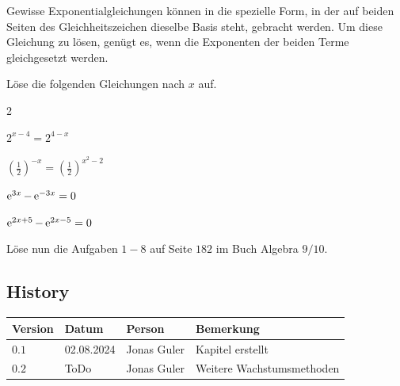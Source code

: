 \documentclass[11pt,oneside]{article}
\begin{document}
	\begin{satz}[Exponentenvergleich]
		Gewisse Exponentialgleichungen können in die spezielle Form, in der auf beiden Seiten des Gleichheitszeichen dieselbe Basis steht, gebracht werden. Um diese Gleichung zu lösen, genügt es, wenn die Exponenten der beiden Terme gleichgesetzt werden.
	\end{satz}
	\begin{aufgabe}
		Löse die folgenden Gleichungen nach $x$ auf.
		\begin{enumerate}[label=\alph*)]\end{enumerate}
		Löse nun die Aufgaben $1-8$ auf Seite $182$ im Buch Algebra $9/10$.
	\end{aufgabe}

\newpage
\subsection*{History}
\begin{table}[H]
	\centering
	\begin{tabular}{|p{13mm}|p{20mm}|p{30mm}|p{70mm}|}\hline
		Version & Datum & Person & Bemerkung \\\hline
		$0.1$ & 02.08.2024 & Jonas Guler & Kapitel erstellt \\\hline
		$0.2$ & ToDo & Jonas Guler & Weitere Wachstumsmethoden \\\hline
	\end{tabular}
\end{table}
\end{document}
